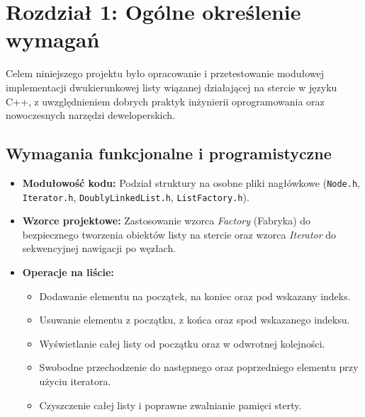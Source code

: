\section{Rozdział 1: Ogólne określenie wymagań}

Celem niniejszego projektu było opracowanie i przetestowanie modułowej implementacji dwukierunkowej listy wiązanej działającej na stercie w języku C++, z uwzględnieniem dobrych praktyk inżynierii oprogramowania oraz nowoczesnych narzędzi deweloperskich.

\subsection{Wymagania funkcjonalne i programistyczne}
\begin{itemize}
    \item \textbf{Modułowość kodu:} Podział struktury na osobne pliki nagłówkowe (\texttt{Node.h}, \texttt{Iterator.h}, \texttt{DoublyLinkedList.h}, \texttt{ListFactory.h}).
    \item \textbf{Wzorce projektowe:} Zastosowanie wzorca \textit{Factory} (Fabryka) do bezpiecznego tworzenia obiektów listy na stercie oraz wzorca \textit{Iterator} do sekwencyjnej nawigacji po węzłach.
    \item \textbf{Operacje na liście:}
    \begin{itemize}
        \item Dodawanie elementu na początek, na koniec oraz pod wskazany indeks.
        \item Usuwanie elementu z początku, z końca oraz spod wskazanego indeksu.
        \item Wyświetlanie całej listy od początku oraz w odwrotnej kolejności.
        \item Swobodne przechodzenie do następnego oraz poprzedniego elementu przy użyciu iteratora.
        \item Czyszczenie całej listy i poprawne zwalnianie pamięci sterty.
    \end{itemize}
\end{itemize}

